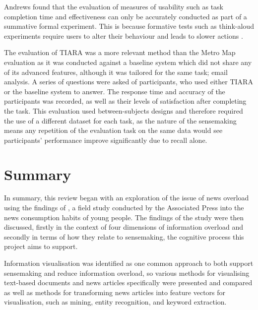 Andrews \citep{EvaluatingInformationVisualisations} found that the evaluation of measures of usability such as task completion time and effectiveness can only be accurately conducted as part of a summative formal experiment. This is because formative tests such as think-aloud experiments require users to alter their behaviour and leads to slower actions \citep{VerbalReportsAsData}.

The evaluation of TIARA \citep{InteractiveTopicBasedVisualTextSummarizationAndAnalysis} was a more relevant method than the Metro Map evaluation as it was conducted against a baseline system which did not share any of its advanced features, although it was tailored for the same task; email analysis. A series of questions were asked of participants, who used either TIARA or the baseline system to answer. The response time and accuracy of the participants was recorded, as well as their levels of satisfaction after completing the task. This evaluation used between-subjects designs and therefore required the use of a different dataset for each task, as the nature of the sensemaking means any repetition of the evaluation task on the same data would see participants' performance improve significantly due to recall alone.

\section{Summary}
In summary, this review began with an exploration of the issue of news overload using the findings of \citep{anewmodelfornews}, a field study conducted by the Associated Press into the news consumption habits of young people. The findings of the study were then discussed, firstly in the context of four dimensions of information overload \citep{TowardsAnOptimalResolutionToInformationOverload, GuestEditorsIntroductionInformationOverload} and secondly in terms of how they relate to sensemaking, the cognitive process this project aims to support.

Information visualisation was identified as one common approach to both support sensemaking and reduce information overload, so various methods for visualising text-based documents and news articles specifically were presented and compared \citep{ESTHETE, ThemeRiver, InteractiveTopicBasedVisualTextSummarizationAndAnalysis, ExploringLongRunningNewsStoriesUsingWikipedia, Nreader} as well as methods for transforming news articles into feature vectors for visualisation, such as mining, entity recognition, and keyword extraction.

